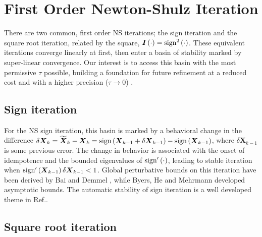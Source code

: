 \documentclass[letterpaper,twocolumn,amsmath,amsfont,amssymb,english,aps,jcp,preprintnumbers,groupaddress,nofootinbib,tightenlines,floatfix]{revtex4}
\newcommand{\mat}[1]{\boldsymbol{#1}}
\theoremstyle{plain}
\theoremstyle{remark}
\theoremstyle{plain}
\begin{document}
\section{First Order Newton-Shulz Iteration}

There are two common, first order NS iterations; the sign iteration
and the square root iteration, related by the square, $\mat{I}\left(
\cdot \right)= {\rm sign}^2\left( \cdot \right) $.  These equivalent
iterations converge linearly at first, then enter a basin of stability
marked by super-linear convergence.  Our interest is to access this
basin with the most permissive $\tau$ possible, building a foundation
for future refinement
at a reduced cost and with a higher precision ($\tau \rightarrow 0$)
\cite{MChallacombe16}.

\subsection{Sign iteration}

For the NS sign iteration, this basin is marked by a behavioral change
in the difference $\delta \mat{X}_k = \widetilde{\mat{X}}_k -\mat{X}_k
= {\rm sign} \left(\mat{X}_{k-1}+\delta \mat{X}_{k-1} \right) -{\rm
  sign} \left(\mat{X}_{k-1} \right)$, where $\delta \mat{X}_{k-1}$ is
some previous error.  The change in behavior is associated with the
onset of idempotence and the bounded eigenvalues of ${\rm sign}'\left(
\cdot \right)$, leading to stable iteration when ${\rm sign}'\left(
\mat{X}_{k-1} \right) \delta \mat{X}_{k-1} < 1 $.  Global perturbative
bounds on this iteration have been derived by Bai and Demmel
\cite{Bai98usingthe}, while Byers, He and Mehrmann \cite{} developed
asymptotic bounds.  The automatic stability of sign iteration is a
well developed theme in Ref.\cite{Higham08}.

\subsection{Square root iteration}
\end{document}
